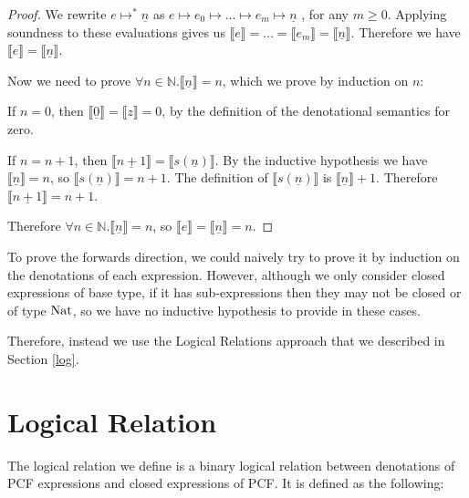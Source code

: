 \begin{proof}
We rewrite $e \mapsto^* \underline{n}$ as $e \mapsto e_0 \mapsto \dots \mapsto e_m \mapsto \underline{n}$ , for any $m \geq 0$. Applying soundness to these evaluations gives us $\llbracket e\rrbracket = \dots = \llbracket e_m \rrbracket = \llbracket \underline{n} \rrbracket$. Therefore we have $\llbracket  e \rrbracket = \llbracket \underline{n} \rrbracket$.

Now we need to prove $\forall n \in \mathbb{N}. \llbracket \underline{n} \rrbracket = n$, which we prove by induction on $n$:

If $n = 0$, then $\llbracket \underline{0} \rrbracket = \llbracket z \rrbracket = 0$, by the definition of the denotational semantics for zero.


If $n = n + 1$, then $\llbracket \underline{n + 1} \rrbracket = \llbracket s(\underline{n}) \rrbracket$. By the inductive hypothesis we have $\llbracket \underline{n} \rrbracket = n$, so $\llbracket s(\underline{n}) \rrbracket = n + 1$. The definition of $\llbracket s(\underline{n}) \rrbracket$ is $\llbracket  \underline{n} \rrbracket + 1$. Therefore $\llbracket \underline{n + 1} \rrbracket = n + 1$.


Therefore $\forall n \in \mathbb{N}. \llbracket \underline{n} \rrbracket  = n$, so $\llbracket e \rrbracket =  \llbracket \underline{n} \rrbracket  = n$.

\end{proof}

To prove the forwards direction, we could naively try to prove it by induction on the denotations of each expression. However,  although we only consider closed expressions of base type, if it has sub-expressions then they may not be closed or of type $\operatorname{Nat}$, so we have no inductive hypothesis to provide in these cases.

Therefore, instead we use the Logical Relations approach that we described in Section \ref{log}.

\section{Logical Relation}
The logical relation we define is a binary logical relation between denotations of PCF expressions and closed expressions of PCF. It is defined as the following:

